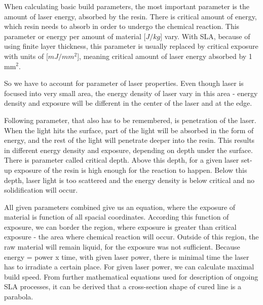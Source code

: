 \documentclass[a4paper, 11pt, reqno]{report}
\begin{document}
	When calculating basic build parameters, the most important parameter is the amount of laser energy, absorbed by the resin. There is critical amount of energy, which resin needs to absorb in order to undergo the chemical reaction. This parameter or energy per amount of material [$J/kg$] vary. With SLA, because of using finite layer thickness, this parameter is usually replaced by critical exposure with units of [$mJ/mm^2$], meaning critical amount of laser energy absorbed by 1 mm$^2$.

	So we have to account for parameter of laser properties. Even though laser is focused into very small area, the energy density of laser vary in this area - energy density and exposure will be different in the center of the laser and at the edge.
	
	Following parameter, that also has to be remembered, is penetration of the laser. When the light hits the surface, part of the light will be absorbed in the form of energy, and the rest of the light will penetrate deeper into the resin. This results in different energy density and exposure, depending on depth under the surface. There is parameter called critical depth. Above this depth, for a given laser set-up exposure of the resin is high enough for the reaction to happen. Below this depth, laser light is too scattered and the energy density is below critical and no solidification will occur.


	All given parameters combined give us an equation, where the exposure of material is function of all spacial coordinates. According this function of exposure, we can border the region, where exposure is greater than critical exposure - the area where chemical reaction will occur. Outside of this region, the raw material will remain liquid, for the exposure was not sufficient. Because energy = power x time, with given laser power, there is minimal time the laser has to irradiate a certain place. For given laser power, we can calculate maximal build speed. From further mathematical equations used for description of ongoing SLA processes, it can be derived that a cross-section shape of cured line is a parabola.\\
%
\end{document}

